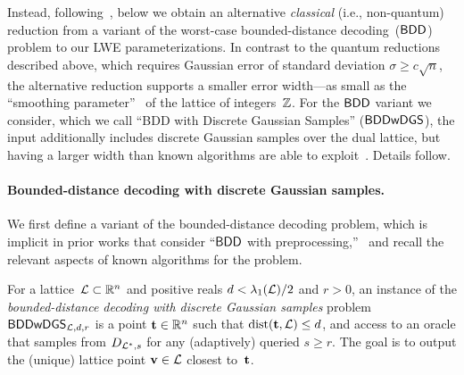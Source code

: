 Instead, following~\cite[Section~1.1]{Reg09}, below we obtain an
alternative \emph{classical} (i.e., non-quantum) reduction from a
variant of the worst-case bounded-distance decoding~($\mathsf{BDD}$) problem
to our LWE parameterizations. In contrast to the quantum reductions
described above, which requires Gaussian error of standard deviation
$\sigma \geq c \sqrt{n}$, the alternative reduction supports a
smaller error width---as small as the ``smoothing
parameter''~\cite{DBLP:journals/siamcomp/MicciancioR07} of the lattice
of integers~$\mathbb{Z}$.  For the $\mathsf{BDD}$ variant we consider, which we call
``BDD with Discrete Gaussian Samples'' ($\mathsf{BDDwDGS}$), the input
additionally includes discrete Gaussian samples over the dual lattice,
but having a larger width than known algorithms are able to
exploit~\cite{DBLP:conf/approx/LiuLM06,DBLP:conf/coco/DadushRS14}. Details
follow.


\paragraph{Bounded-distance decoding with discrete Gaussian samples.}


We first define a variant of the bounded-distance decoding problem,
which is implicit in prior works that consider ``$\mathsf{BDD}$ with
preprocessing,''~\cite{DBLP:journals/jacm/AharonovR05,DBLP:conf/approx/LiuLM06,DBLP:conf/coco/DadushRS14}
and recall the relevant aspects of known algorithms for the problem.

\begin{definition}
  \label{def:BDDwDGS}
  For a lattice~$\mathcal{L} \subset \mathbb{R}^{n}$ and positive reals
  $d < \lambda_{1}(\mathcal{L})/2$ and $r > 0$, an instance of the
  \emph{bounded-distance decoding with discrete Gaussian samples}
  problem $\mathsf{BDDwDGS}_{\mathcal{L},d,r}$ is a point $\mathbf{t} \in \mathbb{R}^{n}$ such that
  $\operatorname{dist}(\mathbf{t},\mathcal{L}) \leq d$, and access to an oracle that samples from
  $D_{\mathcal{L}^{*},s}$ for any (adaptively) queried $s \geq r$. The goal is
  to output the (unique) lattice point $\mathbf{v} \in \mathcal{L}$ closest to~$\mathbf{t}$.
\end{definition}

